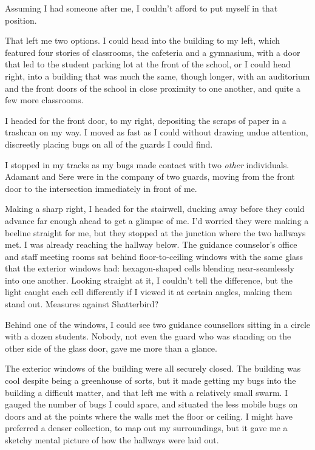 Assuming I had someone after me, I couldn't afford to put myself in that position.



That left me two options.  I could head into the building to my left, which featured four stories of classrooms, the cafeteria and a gymnasium, with a door that led to the student parking lot at the front of the school, or I could head right, into a building that was much the same, though longer, with an auditorium and the front doors of the school in close proximity to one another, and quite a few more classrooms.



I headed for the front door, to my right, depositing the scraps of paper in a trashcan on my way.  I moved as fast as I could without drawing undue attention, discreetly placing bugs on all of the guards I could find.



I stopped in my tracks as my bugs made contact with two \emph{other} individuals.  Adamant and Sere were in the company of two guards, moving from the front door to the intersection immediately in front of me.



Making a sharp right, I headed for the stairwell, ducking away before they could advance far enough ahead to get a glimpse of me.  I'd worried they were making a beeline straight for me, but they stopped at the junction where the two hallways met.  I was already reaching the hallway below.  The guidance counselor's office and staff meeting rooms sat behind floor-to-ceiling windows with the same glass that the exterior windows had: hexagon-shaped cells blending near-seamlessly into one another.  Looking straight at it, I couldn't tell the difference, but the light caught each cell differently if I viewed it at certain angles, making them stand out.  Measures against Shatterbird?



Behind one of the windows, I could see two guidance counsellors sitting in a circle with a dozen students.  Nobody, not even the guard who was standing on the other side of the glass door, gave me more than a glance.



The exterior windows of the building were all securely closed.  The building was cool despite being a greenhouse of sorts, but it made getting my bugs into the building a difficult matter, and that left me with a relatively small swarm.  I gauged the number of bugs I could spare, and situated the less mobile bugs on doors and at the points where the walls met the floor or ceiling.  I might have preferred a denser collection, to map out my surroundings, but it gave me a sketchy mental picture of how the hallways were laid out.



